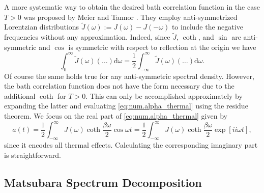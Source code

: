 A more systematic way to obtain the desired bath correlation function in the case $T > 0$ was proposed by Meier and Tannor \cite{MeTa99_non_markovian}.
They employ anti-symmetrized Lorentzian distributions $\tilde J(\omega) := J(\omega) - J(-\omega)$ to include the negative frequencies without any approximation.
Indeed, since $\tilde J$, $\coth$, and $\sin$ are anti-symmetric and $\cos$ is symmetric with respect to reflection at the origin we have
\begin{equation*}
  \int_0^\infty \tilde J(\omega) (\dots) \mathrm{d}\omega = \frac{1}{2}\int_{-\infty}^\infty \tilde J(\omega) (\dots) \mathrm{d}\omega.
\end{equation*}
Of course the same holds true for any anti-symmetric spectral density.
However, the bath correlation function does not have the form necessary due to the additional $\coth$ for $T > 0$.
This can only be accomplished approximately by expanding the latter and evaluating \autoref{eq:num.alpha_thermal} using the residue theorem.
We focus on the real part of \autoref{eq:num.alpha_thermal} given by
\begin{equation}
  a(t) = \frac{1}{2} \int_{-\infty}^\infty J(\omega) \coth \frac{\beta\omega}{2} \cos \omega t
  = \frac{1}{2} \int_{-\infty}^\infty J(\omega) \coth \frac{\beta\omega}{2} \exp[ii \omega t],
  \label{eq:num.alpha_thermal_re}
\end{equation}
since it encodes all thermal effects.
Calculating the corresponding imaginary part is straightforward.


\subsection{Matsubara Spectrum Decomposition}
\label{sub:num.expansion.matsubara}

